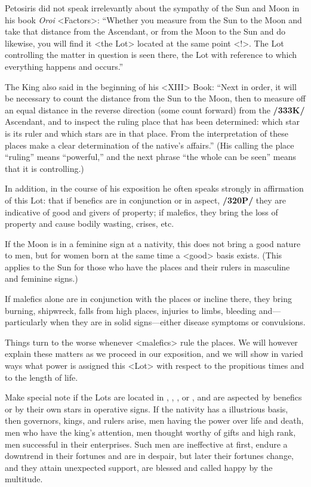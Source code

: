 Petosiris did not speak irrelevantly about the sympathy of the Sun and Moon in his book \textit{Oroi} <Factors>: “Whether you measure from the Sun to the Moon and take that distance from the Ascendant,
or from the Moon to the Sun and do likewise, you will find it <the Lot> located at the same point <!>. The Lot controlling the matter in question is seen there, the Lot with reference to which everything
happens and occurs.” 

The King also said in the beginning of his <XIII> Book: “Next in order, it will be necessary to count the distance from the Sun to the Moon, then to measure off an equal distance in the reverse direction (some count forward) from the \textbf{/333K/} Ascendant, and to inspect the ruling place that has been determined: which star is its ruler and which stars are in that place. From the interpretation of these places make a clear determination of the native’s affairs.” (His calling the place “ruling” means “powerful,” and the next phrase “the whole can be seen” means that it is controlling.) 

In addition, in the course of his exposition he often speaks strongly in affirmation of this Lot: that if benefics are in conjunction or in aspect,
\textbf{/320P/} they are indicative of good and givers of property; if malefics, they bring the loss of property and cause bodily wasting, crises, etc.

If the Moon is in a feminine sign at a nativity, this does not bring a good nature to men, but for women born at the same time a <good> basis exists. (This applies to the Sun for those who have the
places and their rulers in masculine and feminine signs.) 

If malefics alone are in conjunction with the  places or incline there, they bring burning, shipwreck, falls from high places, injuries to limbs, bleeding and—particularly when they are in solid signs—either disease symptoms or convulsions. 

Things turn to the worse whenever <malefics> rule the places. We will however explain these matters as we proceed in our exposition, and we will show in varied ways what power is assigned this <Lot> with respect to the propitious times and to the length of life.

Make special note if the Lots are located in \Cancer, \Leo, \Capricorn, or \Aquarius, and are aspected by benefics or by their own stars in operative signs. If the nativity has a illustrious basis, then governors,
kings, and rulers arise, men having the power over life and death, men who have the king’s attention, men thought worthy of gifts and high rank, men successful in their enterprises. Such men are ineffective at first, endure a downtrend in their fortunes and are in despair, but later their fortunes change, and they attain unexpected support, are blessed and called happy by the multitude. 

